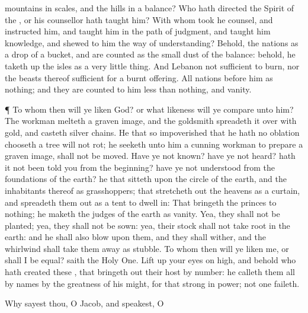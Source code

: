 {mountains in
scales, and the
hills in a
balance?
Who hath
directed the
Spirit of the
{}, or
{} his
counsellor hath
taught him?
With whom took he
counsel, and
{}
instructed him, and
taught him in the
path of
judgment, and
taught him
knowledge, and
shewed to him the
way of
understanding?
Behold, the
nations
{} as a
drop of a
bucket, and are
counted as the small
dust of the
balance: behold, he taketh
up the
isles as a very little
thing.
And
Lebanon
{}
not
sufficient to
burn, nor the
beasts thereof
sufficient for a burnt
offering.
All
nations before him
{} as nothing; and they are
counted to him less than
nothing, and
vanity.
\par }{\PP {}¶ To whom then will ye
liken
God? or what
likeness will ye
compare unto him?
The
workman
melteth a graven
image, and the
goldsmith
spreadeth it over with
gold, and
casteth
silver
chains.
He that
{} so
impoverished that he hath no
oblation
chooseth a
tree
{} will not
rot; he
seeketh unto him a
cunning
workman to
prepare a graven
image,
{} shall not be
moved.
Have ye not
known? have ye not
heard? hath it not been
told you from the
beginning? have ye not
understood from the
foundations of the
earth?
 he that
sitteth upon the
circle of the
earth, and the
inhabitants thereof
{} as
grasshoppers; that stretcheth
out the
heavens as a
curtain, and spreadeth them
out as a
tent to dwell
in:
That
bringeth the
princes to nothing; he
maketh the
judges of the
earth as
vanity.
Yea, they shall not be
planted; yea, they shall not be
sown: yea, their
stock shall not take
root in the
earth: and he shall also
blow upon them, and they shall
wither, and the
whirlwind shall
take them away as
stubble.
To whom then will ye
liken me, or shall I be
equal?
saith the Holy
One.
Lift
up your
eyes on
high, and
behold who hath
created these
{}, that bringeth
out their
host by
number: he
calleth them all by
names by the
greatness of his
might, for that
{}
strong in
power; not
one
faileth.
\par }{\PP {}Why
sayest thou, O
Jacob, and
speakest, O
}

